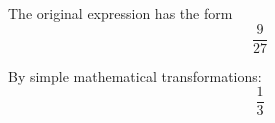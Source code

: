 \documentclass[a4paper, 12pt]{article}
\begin{document}
                          
The original expression has the form \[  \frac {{9}} {{27}} \]

By simple mathematical transformations: \[  \frac {{1}} {{3}} \]
 \newline
\end{document}
